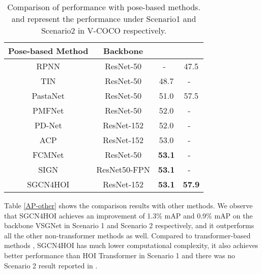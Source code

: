 \documentclass[a4paper, 10pt, conference]{IEEEtran}
\begin{document}
\begin{table}
	\centering
	\caption{Comparison of performance with pose-based methods.  and  represent the performance under Scenario1 and Scenario2 in V-COCO respectively.}
	\label{AP}
\begin{tabular}{cccc}\hline
		
		Pose-based Method & Backbone &  &  \\ \hline

		RPNN \cite{RPNN} & ResNet-50  & -\ & 47.5  \\
		TIN \cite{TIN} & ResNet-50  & 48.7 & -\  \\
		PastaNet \cite{PastaNet} & ResNet-50 & 51.0 & 57.5  \\
		PMFNet \cite{PMFNet} & ResNet-50 & 52.0 & -\ \\
		PD-Net \cite{PD-Net} & ResNet-152  & 52.0 & -\ \\
		ACP \cite{ACP} & ResNet-152 & 53.0 & -\ \\
		FCMNet \cite{FCMNet} & ResNet-50 & \textbf{53.1} & -\ \\ 
		SIGN \cite{SIGN} & ResNet50-FPN & \textbf{53.1} & -\ \\ \hline
		SGCN4HOI & ResNet-152  &  \textbf{53.1} & \textbf{57.9} \\ \hline
		
	\end{tabular}
\end{table}

Table \ref{AP-other} shows the comparison results with other methods. We observe that SGCN4HOI achieves an improvement of 1.3\% mAP and 0.9\% mAP on the backbone VSGNet \cite{VSGNet} in Scenario 1 and Scenario 2 respectively, and it outperforms all the other non-transformer methods as well. Compared to transformer-based methods \cite{HOITransformer,HOTR}, SGCN4HOI has much lower computational complexity, it also achieves better performance than HOI Transformer \cite{HOITransformer} in Scenario 1 and there was no Scenario 2 result reported in \cite{HOITransformer}.
\end{document}
